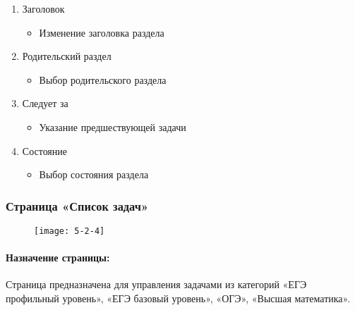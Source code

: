 \begin{enumerate}
\begin{enumerate}
\begin{enumerate}
			\item Заголовок
			\begin{itemize}
				\item Изменение заголовка раздела
			\end{itemize}

			\item Родительский раздел
			\begin{itemize}
				\item Выбор родительского раздела
			\end{itemize}

			\item Следует за
			\begin{itemize}
				\item Указание предшествующей задачи
			\end{itemize}

			\item Состояние
			\begin{itemize}
				\item Выбор состояния раздела
			\end{itemize}

		\end{enumerate}
	\end{enumerate}
\end{enumerate}

\subsubsection{Страница «Список задач»}
\begin{figure}[H]
	\texttt{[image: 5-2-4]}
\end{figure}
\paragraph{Назначение страницы:} Страница предназначена для управления задачами из категорий «ЕГЭ профильный уровень», «ЕГЭ базовый уровень», «ОГЭ», «Высшая математика».

